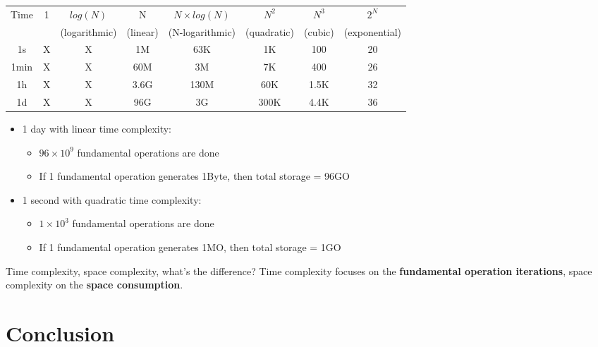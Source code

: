 \documentclass{beamer}[10pt, usepdftitle=false, handout]
\begin{document}
	\begin{frame}
	
		\begin{tabular}{ c | c | c | c | c | c | c | c }
	Time & 1 & $log(N)$ & N & $N \times log(N)$ & $N^2$ & $N^3$ & $2^N$ \\ 
	& & \tiny{(logarithmic)} & \tiny{(linear)} & \tiny{(N-logarithmic)} & \tiny{(quadratic)} & \tiny{(cubic)}  & \tiny{(exponential)} \\ \hline
	1s & X & X & 1M & 63K & 1K & 100 & 20 \\
	1min & X & X & 60M & 3M & 7K & 400 & 26 \\
	1h & X & X & 3.6G & 130M & 60K & 1.5K & 32 \\		
	1d & X & X & 96G & 3G & 300K & 4.4K & 36 \\		
	\end{tabular}	
	
	\vspace*{0.5em}
	
	\begin{itemize}
	\item {1 day with linear time complexity: 
		\begin{itemize}
			\item {$96\times 10^9$ fundamental operations are done}
			\item {If 1 fundamental operation generates 1Byte, then total storage = 96GO}			
		\end{itemize}				
	}
	\item {1 second with quadratic time complexity: 
		\begin{itemize}
			\item {$1\times 10^3$ fundamental operations are done}
			\item {If 1 fundamental operation generates 1MO, then total storage = 1GO}	
		\end{itemize}			
	}	
	\end{itemize}
	
	\pause	
	
	\begin{block}{Time complexity, space complexity, what's the difference?}
	Time complexity focuses on the \textbf{fundamental operation iterations}, space complexity on the \textbf{space consumption}.
	\end{block}		
		
	\end{frame}
	
	\section{Conclusion}	
	
\end{document}
